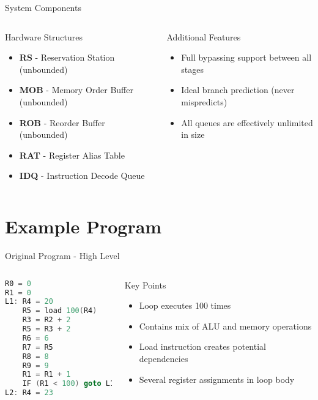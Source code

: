 \documentclass[aspectratio=169,12pt]{beamer}
\begin{document}
\begin{frame}{System Components}
\begin{columns}[t]
\begin{block}{Hardware Structures}
\begin{itemize}
    \item \textbf{RS} - Reservation Station (unbounded)
    \item \textbf{MOB} - Memory Order Buffer (unbounded)
    \item \textbf{ROB} - Reorder Buffer (unbounded)
    \item \textbf{RAT} - Register Alias Table
    \item \textbf{IDQ} - Instruction Decode Queue
\end{itemize}
\end{block}

\begin{block}{Additional Features}
\begin{itemize}
    \item Full bypassing support between all stages
    \item Ideal branch prediction (never mispredicts)
    \item All queues are effectively unlimited in size
\end{itemize}
\end{block}
\end{columns}
\end{frame}

\section{Example Program}

\begin{frame}[fragile]{Original Program - High Level}
\begin{columns}
\begin{lstlisting}[language=C]
R0 = 0
R1 = 0
L1: R4 = 20
    R5 = load 100(R4)
    R3 = R2 + 2
    R5 = R3 + 2
    R6 = 6
    R7 = R5
    R8 = 8
    R9 = 9
    R1 = R1 + 1
    IF (R1 < 100) goto L1
L2: R4 = 23
\end{lstlisting}

\begin{block}{Key Points}
\begin{itemize}
    \item Loop executes 100 times
    \item Contains mix of ALU and memory operations
    \item Load instruction creates potential dependencies
    \item Several register assignments in loop body
\end{itemize}
\end{block}
\end{columns}
\end{frame}
\end{document}
